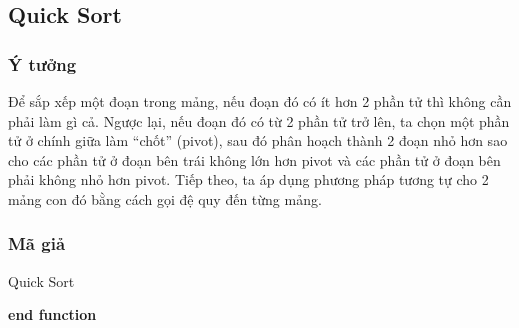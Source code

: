 \subsection{Quick Sort}

\subsubsection{Ý tưởng}

Để sắp xếp một đoạn trong mảng, nếu đoạn đó có ít hơn 2 phần tử thì không cần phải làm gì cả. Ngược lại, nếu đoạn đó có từ 2 phần tử trở lên, ta chọn một phần tử ở chính giữa làm “chốt” (pivot), sau đó phân hoạch thành 2 đoạn nhỏ hơn sao cho các phần tử ở đoạn bên trái không lớn hơn pivot và các phần tử ở đoạn bên phải không nhỏ hơn pivot. Tiếp theo, ta áp dụng phương pháp tương tự cho 2 mảng con đó bằng cách gọi đệ quy đến từng mảng. \cite{idea-quick} \cite[p.~93--94]{hoang2008}

\subsubsection{Mã giả}

\begin{algorithm}[H]
\caption{Quick Sort \cite[p.~183--184]{cormen2022} \cite{code-quick}}
\label{quick-sort}

\textbf{end function}
\end{algorithm}

